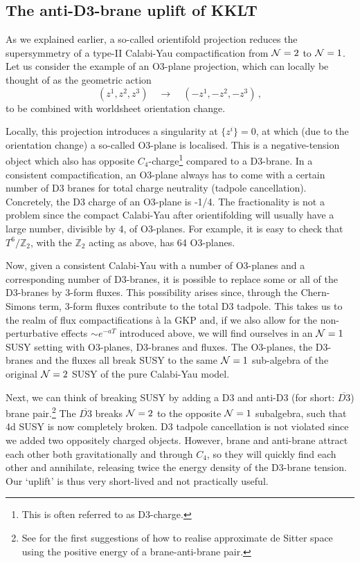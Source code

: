 \documentclass[12pt]{article}
\newcommand{\be}{\begin{equation}}
\newcommand{\ee}{\end{equation}}
\numberwithin{equation}{section}
\begin{document}
\subsection{The anti-D3-brane uplift of KKLT}\label{kklt2}

As we explained earlier, a so-called orientifold projection reduces the  supersymmetry of a type-II Calabi-Yau compactification from ${\cal N}=2$ to ${\cal N}=1$. Let us consider the example of an O3-plane projection, which can locally be thought of as the geometric action
\be
(z^1,z^2,z^3)\quad\to\quad (-z^1,-z^2,-z^3)\,,
\ee
to be combined with worldsheet orientation change.

Locally, this projection introduces a singularity at $\{z^i\}=0$, at which (due to the orientation change) a so-called O3-plane is localised. This is a negative-tension object which also has opposite $C_4$-charge\footnote{
This 
is often referred to as D3-charge.
} 
compared to a D3-brane. In a consistent compactification, an O3-plane always has to come with a certain number of D3 branes for total charge neutrality (tadpole cancellation). 
Concretely, the D3 charge of an O3-plane is -1/4. The fractionality is not a problem since the compact Calabi-Yau after orientifolding will usually have a large number, divisible by 4, of O3-planes. For example, it is easy to check that $T^6/\mathbb{Z}_2$, with the $\mathbb{Z}_2$ acting as above, has 64 O3-planes. 

Now, given a consistent Calabi-Yau with a number of O3-planes and a corresponding number of D3-branes, it is possible to replace some or all of the D3-branes by 3-form fluxes. This possibility arises since, through the Chern-Simons term, 3-form fluxes contribute to the total D3 tadpole. This takes us to the realm of flux compactifications \`{a} la GKP and, if we also allow for the non-perturbative effects $\sim e^{-aT}$ introduced above, we will find ourselves in an ${\cal N}=1$ SUSY setting with O3-planes, D3-branes and fluxes. The O3-planes, the D3-branes and the fluxes all break SUSY to the same ${\cal N}=1$ sub-algebra of the original ${\cal N}=2$ SUSY of the pure Calabi-Yau model. 

Next, we can think of breaking SUSY by adding a D3 and anti-D3 (for short: $\overline{D3}$) brane pair.\footnote{
See \cite{Alexander:2001ks, Dvali:2001fw, Burgess:2001fx} for the first suggestions of how to realise approximate de Sitter space using the positive energy of a brane-anti-brane pair.
}
The $\overline{D3}$ breaks ${\cal N}=2$ to the opposite ${\cal N}=1$ subalgebra, such that 4d SUSY is now completely broken. D3 tadpole cancellation is not violated since we added two oppositely charged objects. However, brane and anti-brane attract each other both gravitationally and through $C_4$, so they will quickly find each other and annihilate, releasing twice the energy density of the D3-brane tension. Our `uplift' is thus very short-lived and not practically useful.
\end{document}
